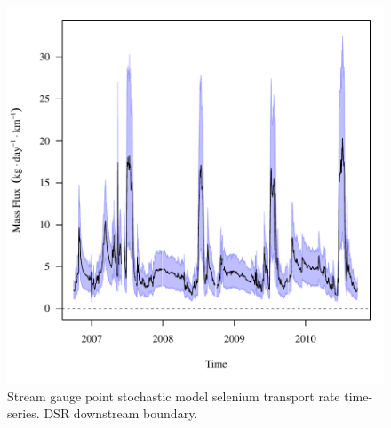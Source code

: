 \begin{figure}[htbp]
	\begin{center}
	\includegraphics[width=6in]{"Figures/Results_DSR/f D106C"}
	\caption{Stream gauge point stochastic model selenium transport rate time-series.  DSR downstream boundary.}
	\end{center}
\end{figure}
\newpage